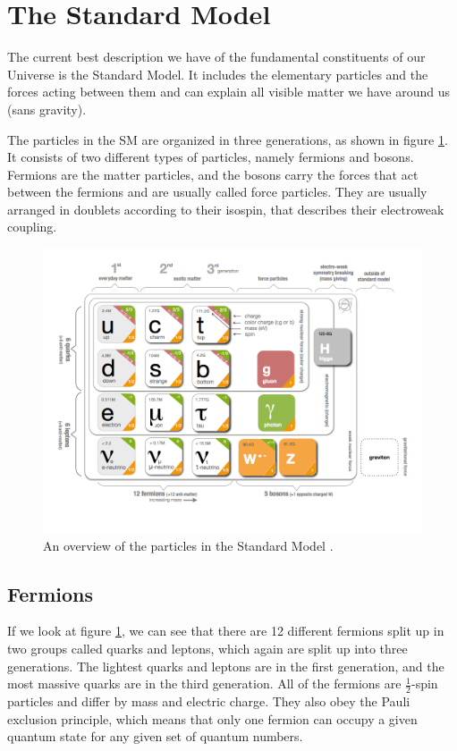 \section{The Standard Model}
\label{sec:SM}
The current best description we have of the fundamental constituents of our Universe is the Standard Model. It includes the elementary particles and the forces acting between them and can explain all visible matter we have around us (sans gravity). 

The particles in the SM are organized in three generations, as shown in figure \ref{fig:SM}. It consists of two different types of particles, namely fermions and bosons. Fermions are the matter particles, and the bosons carry the forces that act between the fermions and are usually called force particles. They are usually arranged in doublets according to their isospin, that describes their electroweak coupling. 

\begin{figure}[H]
    \centering
    \includegraphics[width=\textwidth]{Figures/FromOnline/SM.png}
    \caption{An overview of the particles in the Standard Model \cite{SMpicture}.}
    \label{fig:SM}
\end{figure}

\subsection{Fermions}
If we look at figure \ref{fig:SM}, we can see that there are 12 different fermions split up in two groups called quarks and leptons, which again are split up into three generations. The lightest quarks and leptons are in the first generation, and the most massive quarks are in the third generation. All of the fermions are $\frac{1}{2}$-spin particles and differ by mass and electric charge. They also obey the Pauli exclusion principle, which means that only one fermion can occupy a given quantum state for any given set of quantum numbers.

